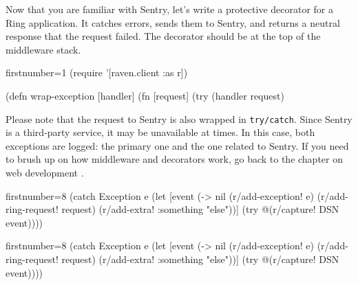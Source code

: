 
Now that you are familiar with Sentry, let's write a protective decorator for a Ring application. It catches errors, sends them to Sentry, and returns a neutral response that the request failed. The decorator should be at the top of the middleware stack.

\begin{english}
  \begin{clojure/lines*}{firstnumber=1}
(require '[raven.client :as r])

(defn wrap-exception
  [handler]
  (fn [request]
    (try
      (handler request)
  \end{clojure/lines*}
\end{english}

\wavebottom

Please note that the request to Sentry is also wrapped in \verb|try/catch|. Since Sentry is a third-party service, it may be unavailable at times. In this case, both exceptions are logged: the primary one and the one related to Sentry.
If you need to brush up on how middleware and decorators work, go back to the chapter on web development .

\wavetop

\ifx\DEVICETYPE\MOBILE

\begin{english}
  \begin{clojure/lines*}{firstnumber=8}
(catch Exception e
  (let [event
        (-> nil
            (r/add-exception! e)
            (r/add-ring-request!
              request)
            (r/add-extra!
              {:something "else"}))]
    (try @(r/capture! DSN event))))
  \end{clojure/lines*}
\end{english}

\else

\begin{english}
  \begin{clojure/lines*}{firstnumber=8}
      (catch Exception e
        (let [event (-> nil
                        (r/add-exception! e)
                        (r/add-ring-request! request)
                        (r/add-extra! {:something "else"}))]
          (try
            @(r/capture! DSN event))))
  \end{clojure/lines*}
\end{english}

\fi

\wavebottom

